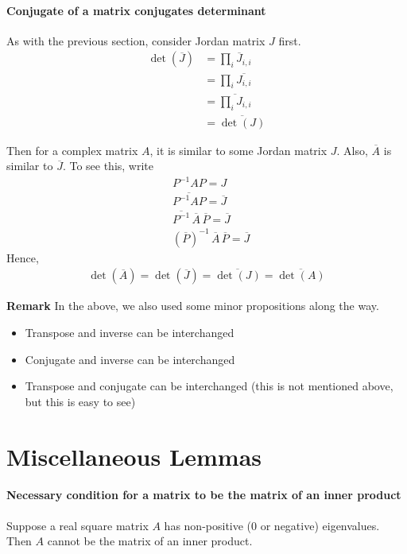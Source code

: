 \documentclass{article}
\begin{document}
\paragraph{Conjugate of a matrix conjugates determinant}
As with the previous section, consider Jordan matrix $J$ first.
\begin{align*}
	\det(\overline{J})
	&=\prod_i\overline{J}_{i,i}\\
	&=\prod_i\overline{J_{i,i}}\\
	&=\overline{\prod_iJ_{i,i}}\\
	&=\overline{\det(J)}
\end{align*}

Then for a complex matrix $A$, it is similar to some Jordan matrix $J$. Also, $\overline{A}$ is similar to $\overline{J}$.
To see this, write
\begin{align*}
	&P^{-1}AP=J\\
	&\overline{P^{-1}AP}=\overline{J}\\
	&\overline{P^{-1}}\,\overline{A}\,\overline{P}=\overline{J}\\
	&(\overline{P})^{-1}\, \overline{A}\, \overline{P}=\overline{J}
\end{align*}
Hence,
\begin{align*}
	\det(\overline{A}) = \det(\overline{J}) = \overline{\det(J)} = \overline{\det(A)}
\end{align*}

\textbf{Remark} In the above, we also used some minor propositions along the way. 
\begin{itemize}
	\item Transpose and inverse can be interchanged
	\item Conjugate and inverse can be interchanged
	\item Transpose and conjugate can be interchanged (this is not mentioned above, but this is easy to see)
\end{itemize}

\section{Miscellaneous Lemmas}
\paragraph{Necessary condition for a matrix to be the matrix of an inner product}

Suppose a real square matrix $A$ has non-positive ($0$ or negative) eigenvalues. Then $A$ cannot be the matrix of an inner product.
\end{document}
